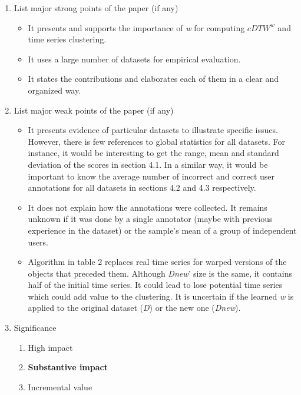 \documentclass{article}
\begin{document}
\begin{enumerate}
 \item List major strong points of the paper (if any) \\ 
 \begin{framed}
  \begin{itemize}
    \item It presents and supports the importance of \textit{w} for computing $cDTW^w$ and time series clustering.
    \item It uses a large number of datasets for empirical evaluation.
    \item It states the contributions and elaborates each of them in a clear and organized way.
  \end{itemize}
 \end{framed}
 
 \item List major weak points of the paper (if any) \\ 
 \begin{framed}
  \begin{itemize}
    \item It presents evidence of particular datasets to illustrate specific issues.  However, there is few references to global statistics for all datasets.  For instance, it would be interesting to get the range, mean and standard deviation of the scores in section 4.1.  In a similar way, it would be important to know the average number of incorrect and correct user annotations for all datasets in sections 4.2 and 4.3 respectively.
    \item It does not explain how the annotations were collected.  It remains unknown if it was done by a single annotator (maybe with previous experience in the dataset) or the sample's mean of a group of independent users. 
    \item Algorithm in table 2 replaces real time series for warped versions of the objects that preceded them.  Although \textit{Dnew}' size is the same, it contains half of the initial time series.  It could lead to lose potential time series which could add value to the clustering. It is uncertain if the learned \textit{w} is applied to the original dataset (\textit{D}) or the new one (\textit{Dnew}).
  \end{itemize}
 \end{framed}

 \item Significance
 \begin{enumerate}[I]
  \item High impact
  \item \textbf{Substantive impact}
  \item Incremental value
 \end{enumerate} 
 

\end{enumerate}
\end{document}
